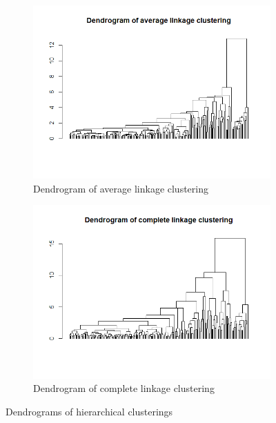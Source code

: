 \documentclass[12pt]{article}
\begin{document}
\begin{figure}[h]
  \begin{subfigure}[b]{0.5\linewidth}
      \centering
      \includegraphics[width=\textwidth]{../images/project2/avgDend.png}
   \caption{Dendrogram of average linkage clustering}\label{fig:avgDend}
  \end{subfigure}%
  \begin{subfigure}[b]{0.5\linewidth}
      \centering
   \includegraphics[width=\textwidth]{../images/project2/compDend.png}
   \caption{Dendrogram of complete linkage clustering}\label{fig:cmpDend}
  \end{subfigure}%
 \caption{Dendrograms of hierarchical clusterings}
\end{figure}
\end{document}

